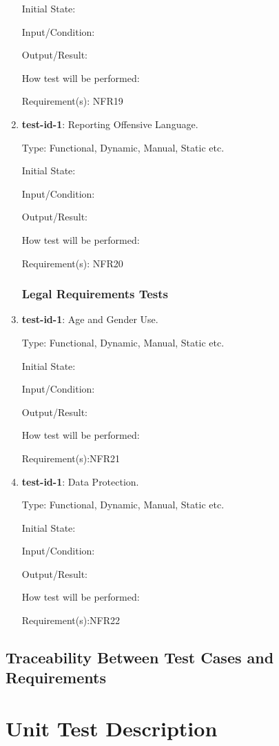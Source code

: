 \documentclass[12pt, titlepage]{article}
\begin{document}
\begin{enumerate}
		Initial State: 
		
		Input/Condition: 
		
		Output/Result: 
		
		How test will be performed: 
		
		Requirement(s): NFR19
		
		\item{\textbf{test-id-1}}: Reporting Offensive Language.
		
		Type: Functional, Dynamic, Manual, Static etc.
		
		Initial State: 
		
		Input/Condition: 
		
		Output/Result: 
		
		How test will be performed: 
		
		Requirement(s): NFR20
	\subsubsection{Legal Requirements Tests}
		\item{\textbf{test-id-1}}: Age and Gender Use.
		
		Type: Functional, Dynamic, Manual, Static etc.
		
		Initial State: 
		
		Input/Condition: 
		
		Output/Result: 
		
		How test will be performed: 
		
		Requirement(s):NFR21
		\item{\textbf{test-id-1}}: Data Protection.
		
		Type: Functional, Dynamic, Manual, Static etc.
		
		Initial State: 
		
		Input/Condition: 
		
		Output/Result: 
		
		How test will be performed: 
		
		Requirement(s):NFR22
	\end{enumerate}
	\subsection{Traceability Between Test Cases and Requirements}
	
	
	\section{Unit Test Description}
	
\end{document}
